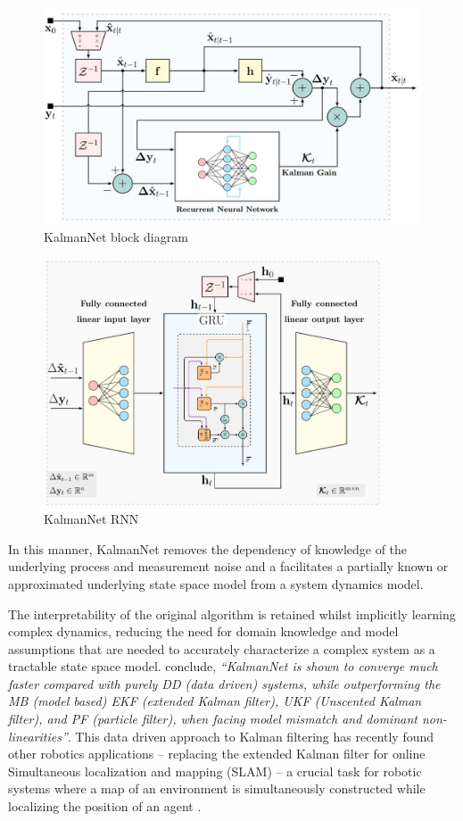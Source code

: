 \documentclass[a4paper,twoside,12pt]{report}
\begin{document}
\begin{figure}[h!]
\begin{center}
\includegraphics[width=12.5cm]{images/kalmannet1.jpg}
\caption{KalmanNet block diagram \citep{kalmannet}}
\label{fig:blockd}
\end{center}
\end{figure}

\begin{figure}[h!]
\begin{center}
\includegraphics[width=10cm]{images/kalmannet2.jpg}
\caption{KalmanNet RNN \citep{kalmannet}}
\label{fig:architecture}
\end{center}
\end{figure}

In this manner, KalmanNet removes the dependency of knowledge of the underlying process and measurement noise and a facilitates a partially known or approximated underlying state space model from a system dynamics model.

The interpretability of the original algorithm is retained whilst implicitly learning complex dynamics, reducing the need for domain knowledge and model assumptions that are needed to accurately characterize a complex system as a tractable state space model. \cite{kalmannet} conclude, \textit{``KalmanNet is shown to converge much faster compared with purely DD (data driven) systems, while outperforming the MB (model based) EKF (extended Kalman filter), UKF (Unscented Kalman filter), and PF (particle filter), when facing model mismatch and dominant non-linearities''}. This data driven approach to Kalman filtering has recently found other robotics applications -- replacing the extended Kalman filter for online Simultaneous localization and mapping (SLAM) -- a crucial task for robotic systems where a map of an environment is simultaneously constructed while localizing the position of an agent \citep{slam}.
\end{document}
